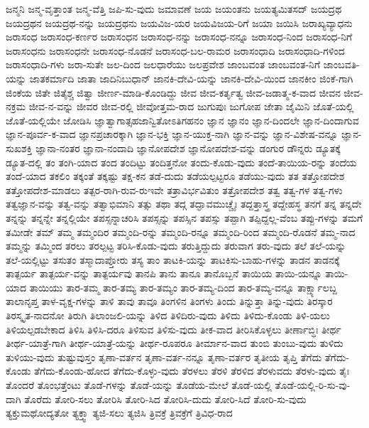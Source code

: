 {ಜನ್ಮನಿ
ಜನ್ಮ-ವೃತ್ತಾಂತ
ಜನ್ಮ-ವೆತ್ತಿ
ಜಪಿ-ಸು-ವುದು
ಜಮಾವಣೆ
ಜಯ
ಜಯಂತನು
ಜಯತ್ಯಮಿತಸದ್
ಜಯದ್ರಥ
ಜಯದ್ರಥನ
ಜಯದ್ರಥ-ನನ್ನು
ಜಯದ್ರಥನು
ಜಯವಿಜ-ಯರ
ಜಯವಿಜಯ-ರಿಗೆ
ಜಯಾ
ಜಯಿಸಿ
ಜರಾಖ್ಯವ್ಯಾಧನು
ಜರಾಸಂಧ
ಜರಾಸಂಧ-ಕರ್ಣರ
ಜರಾಸಂಧನ
ಜರಾಸಂಧ-ನನ್ನು
ಜರಾಸಂಧ-ನನ್ನೂ
ಜರಾಸಂಧ-ನಿಂದ
ಜರಾಸಂಧ-ನಿಗೆ
ಜರಾಸಂಧನು
ಜರಾಸಂಧನೇ
ಜರಾಸಂಧ-ನೊಡನೆ
ಜರಾಸಂಧ-ಬಲ-ರಾಮರ
ಜರಾಸಂಧಾದಿ
ಜರಾಸಂಧಾದಿ-ಗಳಿಂದ
ಜರಾಸಂಧಾದಿ-ಗಳು
ಜರಾ-ಸುತೇ
ಜಲ-ದಿಂದ
ಜಲಧಾರೆಯು
ಜಲಪ್ರವೇಶ
ಜಾಂಬವಂತ
ಜಾಂಬವಂತ-ನಿಗೆ
ಜಾಂಬವತಿ-ಯನ್ನು
ಜಾತಕರ್ಮಾದಿ
ಜಾತಾ
ಜಾದಿನಿಬುಧಾನ್
ಜಾನಕಿ-ದೇವಿ-ಯನ್ನು
ಜಾನಕಿ-ದೇವಿ-ಯಿಂದ
ಜಾನಕೀಂ
ಜಿಂಕೆ-ಗಾಗಿ
ಜಿಂಕೆಯ
ಜಿತೇ
ಜಿತೈಶ್ಚ
ಜಿತ್ವಾ
ಜೀರ್ಣ-ಮಾಡಿ-ಕೊಂಡಿದ್ದು
ಜೀವ
ಜೀವ-ಕರ್ತೃತ್ವ
ಜೀವ-ಜಡಾತ್ಮ-ಕ-ವಾದ
ಜೀವನ
ಜೀವ-ನಕ್ರಮ
ಜೀವ-ನ-ವನ್ನು
ಜೀವರ
ಜೀವ-ರಲ್ಲಿ
ಜೀವೋತ್ತಮ-ರಾದ
ಜುಗುಪುಃ
ಜುಗೋಪ
ಜೇತಾ
ಜೈಮಿನಿ
ಜೊತೆ-ಯಲ್ಲಿ
ಜೊತೆ-ಯಲ್ಲಿಯೇ
ಜೋಡಿಸಿ
ಜ್ಞಾತ್ವಾಗಾತ್ಸಹಜಾನ್ವಿತೋಽತಿಗಹನಂ
ಜ್ಞಾನ
ಜ್ಞಾನಂ
ಜ್ಞಾನ-ದಿಂದಲೇ
ಜ್ಞಾನ-ದಿಂದಾಗುವ
ಜ್ಞಾನ-ಪೂರ್ವ-ಕ-ವಾದ
ಜ್ಞಾನಪ್ರಚಾರಕ್ಕಾಗಿ
ಜ್ಞಾನ-ಭಕ್ತಿ
ಜ್ಞಾನ-ಯುಕ್ತ-ನಾಗಿ
ಜ್ಞಾನ-ವನ್ನು
ಜ್ಞಾನ-ವಿಶೇಷ-ವನ್ನೂ
ಜ್ಞಾನ-ಸುಖಶಕ್ತಿ
ಜ್ಞಾನಾ-ನಂತರ
ಜ್ಞಾನಾ-ನಂದಾದಿ
ಜ್ಞಾನೋಪದೇಶ
ಜ್ಞಾನೋಪದೇಶ-ವನ್ನು
ಡಂಗುರ
ಡೌನ್ನರು
ಡ್ಯೂತಕ್ಕೆ
ಡ್ಯೂತ-ದಲ್ಲಿ
ತಂ
ತಂಗಿ-ಯಾದ
ತಂದ
ತಂದಿಟ್ಟು
ತಂದಿತ್ತನೋ
ತಂದು-ಕೊಡು-ವುದು
ತಂದೆ-ತಾಯಿಯ-ರನ್ನು
ತಂದೆಯ
ತಂದೆ-ಯಾದ
ತಕಲಿಂ
ತಕ್ಕಂತೆ
ತಕ್ಕಷ್ಟು
ತಕ್ಷ-ಕನ
ತಡೆ-ದುದು
ತಡೆಯಲ್ಪಟ್ಟರೂ
ತಡೆಯು-ವುದು
ತತ
ತತ್ತೋಪದೇಶ
ತತ್ತೋಪದೇಶ-ಮಾಡಲು
ತತ್ಪರ-ರಾಗಿ-ರುವ-ರುಇವೇ
ತತ್ರಾವಿರ್ಭವಿತುಂ
ತತ್ರೋಪದೇಶ
ತತ್ವ
ತತ್ವ-ಗಳ
ತತ್ವ-ಗಳು
ತತ್ವಜ್ಞಾನ-ವನ್ನು
ತತ್ವ-ವನ್ನು
ತತ್ವಾಭಿಮಾನಿ
ತತ್ಸು
ತಥಾ
ತದ್ಗ
ತದ್ಘಾವಮುಚ್ಚೈಃ
ತದ್ದತ್ತಾಸ್ತ್ರ
ತದ್ದೇಹಸ್ಥ
ತನಗೆ
ತನ್ನ
ತನ್ನದೇ
ತನ್ನನ್ನು
ತನ್ನನ್ನೇ
ತನ್ನಲ್ಲಿಯೇ
ತಪಸ್ಸನ್ನಾಚರಿಸಿ
ತಪಸ್ಸನ್ನು
ತಪಸ್ಸಿನ
ತಪಸ್ಸು
ತಪ್ಪಾಗಿ
ತಪ್ಪಿದ್ದಲ್ಲ-ವೆಂಬ
ತಪ್ಪು-ಗಳನ್ನು
ತಮಗೆ
ತಮೀಡೇ
ತಮ್
ತಮ್ಮ
ತಮ್ಮಂದಿರ
ತಮ್ಮಂದಿ-ರನ್ನು
ತಮ್ಮಂದಿ-ರನ್ನೂ
ತಮ್ಮಂದಿ-ರಿಂದ
ತಮ್ಮಂದಿ-ರೊಡನೆ
ತಮ್ಮ-ನಾದ
ತಮ್ಮನ್ನು
ತಮ್ಮಿಂದ
ತರಲು
ತರಲ್ಪಟ್ಟ
ತರಿಸಿ-ಕೊಡು-ವುದು
ತರುತ್ತಿದ್ದುದು
ತರುವಾಗ
ತರು-ವುದು
ತಲೆ
ತಲೆ-ಯನ್ನು
ತಲೆ-ಯಲ್ಲಿಟ್ಟು
ತಸುತಂ
ತಸ್ಮಾದಾಪ್ತೋರು
ತಸ್ಯ
ತಾಂ
ತಾಟಕಿ-ಯನ್ನು
ತಾಟಕಿಸು-ಬಾಹು-ಗಳನ್ನು
ತಾಡನ
ತಾಡನಕ್ಕೆ
ತಾತ್ಪರ್ಯ
ತಾತ್ಪರ್ಯ-ವನ್ನು
ತಾತ್ಪರ್ಯವು
ತಾನಪಿ
ತಾನು
ತಾನೂ
ತಾನೊಬ್ಬನೆ
ತಾಯಿಯ
ತಾಯಿ-ಯನ್ನೂ
ತಾಯಿ-ಯಾದ
ತಾಯಿಯು
ತಾರ-ತಮ್ಮ
ತಾರ-ತಮ್ಯ
ತಾರ-ತಮ್ಯಂ
ತಾರ-ತಮ್ಯ-ದಿಂದ
ತಾರ-ತಮ್ಯ-ವನ್ನೂ
ತಾರ್ಕ್ಷ್ಯಾಲಬ್ದ
ತಾಲಾನೃಪ್ತ
ತಾಳ-ವೃಕ್ಷ-ಗಳನ್ನು
ತಾಳಿ
ತಾವು
ತಾವೂ
ತಿಂಗಳಿನ
ತಿಂಗಳು
ತಿಂದು
ತಿನ್ನುತ್ತಾ
ತಿನ್ನು-ವುದು
ತಿರಸ್ಕಾರ
ತಿರಸ್ಕೃತ-ನಾದನೋ
ತಿರುಗಿ
ತಿಲಾಂಜಲಿ-ಯನ್ನು
ತಿಳಿದ
ತಿಳಿದಿರು-ವುದು
ತಿಳಿದು
ತಿಳಿದು-ಕೊಂಡು
ತಿಳಿ-ಯಲು
ತಿಳಿಯಲ್ಪಡಬೇಕಾದ
ತಿಳಿಸಿ
ತಿಳಿಸಿ-ದರೂ
ತಿಳಿಸುವ
ತಿಳಿಸು-ವುದು
ತೀಕ-ವಾದ
ತೀರಿಸಿಕೊಳ್ಳಲು
ತೀರ್ಣಾಬ್ಧಿಃ
ತೀರ್ಥ
ತೀರ್ಥ-ಯಾತ್ರೆ-ಗಾಗಿ
ತೀರ್ಥ-ಯಾತ್ರೆ-ಯನ್ನು
ತೀರ್ಥ-ರೂಪರೂ
ತೀರ್ಮಾನ-ವಾದ
ತುಂಬಿ
ತುಂಬು-ವುದು
ತುಳಿದು
ತುಳಿಯು-ವುದು
ತುಷ್ಟುವುಸ್ತಂ
ತೃಣಾ-ವರ್ತನ
ತೃಣಾ-ವರ್ತ-ನನ್ನೂ
ತೃಣಾ-ವರ್ತರ
ತೃತೀಯ
ತೃಪ್ತಿ
ತೆಗೆದು
ತೆಗೆದು-ಕೊಂಡು
ತೆಗೆದು-ಕೊಂಡು-ಹೋದ
ತೆಗೆದು-ಕೊಳ್ಳು-ವುದು
ತೆರಳಲು
ತೆರಳಿ
ತೆರಳಿದ
ತೆರಳುವದು
ತೆರಳು-ವುದು
ತೈಃ
ತೊಂದರೆ
ತೊಂಭತ್ತೆಂಟು
ತೊಡೆ-ಗಳನ್ನು
ತೊಡೆ-ಯನ್ನು
ತೊಡೆಯ-ಮೇಲೆ
ತೊಡೆ-ಯಲ್ಲಿ
ತೊಡೆ-ಯಲ್ಲಿ-ರಿ-ಸು-ವು-ದಾಗಿ
ತೊರೆದು
ತೋರಿ-ಸಲು
ತೋರಿಸಿ
ತೋರಿ-ಸಿದ
ತೋರಿಸಿ-ದುದು
ತೋರಿ-ಸಿದೆ
ತೋರಿ-ಸು-ವುದು
ತ್ಯಕ್ತುಮಥೋದ್ಯತೋ
ತ್ಯಕ್ತ್ವಾ
ತ್ಯಜಿ-ಸಲು
ತ್ಯಜಿಸಿ
ತ್ರಿವಕ್ರೆ
ತ್ರಿವಕ್ರೆಗೆ
ತ್ರಿವಿಧ-ರಾದ
}
